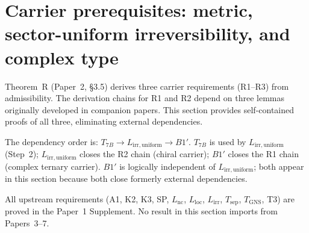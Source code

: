 \documentclass[11pt]{article}
\theoremstyle{definition}
\begin{document}
\section{Carrier prerequisites: metric, sector-uniform irreversibility, and complex type}
\label{sec:carrier_prereqs}

Theorem~R (Paper~2, \S3.5) derives three carrier requirements (R1--R3)
from admissibility.  The derivation chains for R1 and R2 depend on three
lemmas originally developed in companion papers.  This section provides
self-contained proofs of all three, eliminating external dependencies.

The dependency order is: $T_{7B} \to L_{\mathrm{irr,uniform}} \to B1'$.
$T_{7B}$ is used by $L_{\mathrm{irr,uniform}}$ (Step~2);
$L_{\mathrm{irr,uniform}}$ closes the R2 chain (chiral carrier);
$B1'$ closes the R1 chain (complex ternary carrier).
$B1'$ is logically independent of $L_{\mathrm{irr,uniform}}$;
both appear in this section because both close formerly external
dependencies.

All upstream requirements (A1, K2, K3, SP, $L_{\mathrm{nc}}$,
$L_{\mathrm{loc}}$, $L_{\mathrm{irr}}$, $T_{\mathrm{sep}}$,
$T_{\mathrm{GNS}}$, T3) are proved in the Paper~1 Supplement.
No result in this section imports from Papers~3--7.

%
%
%
\end{document}
